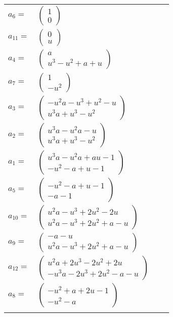 \documentclass[1p]{elsarticle_modified}
\theoremstyle{definition}
\begin{document}
\begin{tabular}{m{7pt} m{180pt} m{7pt} m{180pt} }
\flushright $a_{6}=$&$\begin{pmatrix}1\\0\end{pmatrix}$ \\
\flushright $a_{11}=$&$\begin{pmatrix}0\\u\end{pmatrix}$ \\
\flushright $a_{4}=$&$\begin{pmatrix}a\\u^3- u^2+a+u\end{pmatrix}$ \\
\flushright $a_{7}=$&$\begin{pmatrix}1\\- u^2\end{pmatrix}$ \\
\flushright $a_{3}=$&$\begin{pmatrix}- u^2 a- u^3+u^2- u\\u^3 a+u^3- u^2\end{pmatrix}$ \\
\flushright $a_{2}=$&$\begin{pmatrix}u^3 a- u^2 a- u\\u^3 a+u^3- u^2\end{pmatrix}$ \\
\flushright $a_{1}=$&$\begin{pmatrix}u^3 a- u^2 a+a u-1\\- u^2- a+u-1\end{pmatrix}$ \\
\flushright $a_{5}=$&$\begin{pmatrix}- u^2- a+u-1\\- a-1\end{pmatrix}$ \\
\flushright $a_{10}=$&$\begin{pmatrix}u^2 a- u^3+2 u^2-2 u\\u^2 a- u^3+2 u^2+a- u\end{pmatrix}$ \\
\flushright $a_{9}=$&$\begin{pmatrix}- a- u\\u^2 a- u^3+2 u^2+a- u\end{pmatrix}$ \\
\flushright $a_{12}=$&$\begin{pmatrix}u^2 a+2 u^3-2 u^2+2 u\\- u^3 a-2 u^3+2 u^2- a- u\end{pmatrix}$ \\
\flushright $a_{8}=$&$\begin{pmatrix}- u^2+a+2 u-1\\- u^2- a\end{pmatrix}$\\&\end{tabular}
\end{document}
